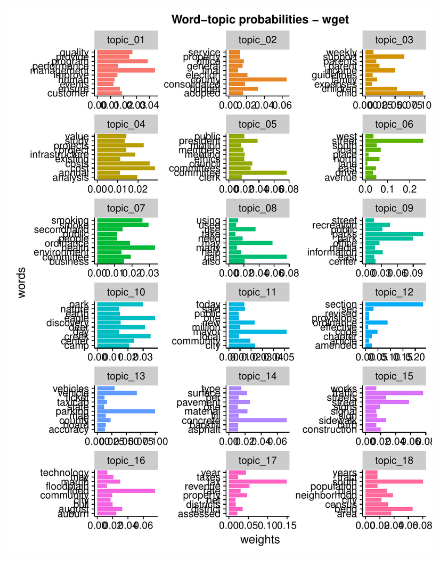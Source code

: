 \documentclass[11pt]{article}
\begin{document}
\begin{figure}[!ht]
	\centering
	\includegraphics[width=\linewidth]{figures/wtp_current.pdf}
\end{figure}
\end{document}
